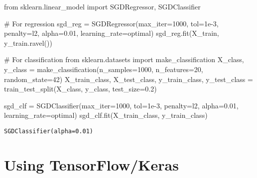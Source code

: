 \documentclass[
  letterpaper,
  DIV=11,
  numbers=noendperiod]{scrreprt}
\newenvironment{Shaded}{\begin{snugshade}}{\end{snugshade}}
\newcommand{\CommentTok}[1]{\textcolor[rgb]{0.37,0.37,0.37}{#1}}
\newcommand{\DecValTok}[1]{\textcolor[rgb]{0.68,0.00,0.00}{#1}}
\newcommand{\FloatTok}[1]{\textcolor[rgb]{0.68,0.00,0.00}{#1}}
\newcommand{\ImportTok}[1]{\textcolor[rgb]{0.00,0.46,0.62}{#1}}
\newcommand{\NormalTok}[1]{\textcolor[rgb]{0.00,0.23,0.31}{#1}}
\newcommand{\OperatorTok}[1]{\textcolor[rgb]{0.37,0.37,0.37}{#1}}
\newcommand{\StringTok}[1]{\textcolor[rgb]{0.13,0.47,0.30}{#1}}
\begin{document}
\begin{Shaded}
\begin{Highlighting}[]
\ImportTok{from}\NormalTok{ sklearn.linear\_model }\ImportTok{import}\NormalTok{ SGDRegressor, SGDClassifier}

\CommentTok{\# For regression}
\NormalTok{sgd\_reg }\OperatorTok{=}\NormalTok{ SGDRegressor(max\_iter}\OperatorTok{=}\DecValTok{1000}\NormalTok{, tol}\OperatorTok{=}\FloatTok{1e{-}3}\NormalTok{, penalty}\OperatorTok{=}\StringTok{\textquotesingle{}l2\textquotesingle{}}\NormalTok{, alpha}\OperatorTok{=}\FloatTok{0.01}\NormalTok{, learning\_rate}\OperatorTok{=}\StringTok{\textquotesingle{}optimal\textquotesingle{}}\NormalTok{)}
\NormalTok{sgd\_reg.fit(X\_train, y\_train.ravel())}

\CommentTok{\# For classification}
\ImportTok{from}\NormalTok{ sklearn.datasets }\ImportTok{import}\NormalTok{ make\_classification}
\NormalTok{X\_class, y\_class }\OperatorTok{=}\NormalTok{ make\_classification(n\_samples}\OperatorTok{=}\DecValTok{1000}\NormalTok{, n\_features}\OperatorTok{=}\DecValTok{20}\NormalTok{, random\_state}\OperatorTok{=}\DecValTok{42}\NormalTok{)}
\NormalTok{X\_train\_class, X\_test\_class, y\_train\_class, y\_test\_class }\OperatorTok{=}\NormalTok{ train\_test\_split(X\_class, y\_class, test\_size}\OperatorTok{=}\FloatTok{0.2}\NormalTok{)}

\NormalTok{sgd\_clf }\OperatorTok{=}\NormalTok{ SGDClassifier(max\_iter}\OperatorTok{=}\DecValTok{1000}\NormalTok{, tol}\OperatorTok{=}\FloatTok{1e{-}3}\NormalTok{, penalty}\OperatorTok{=}\StringTok{\textquotesingle{}l2\textquotesingle{}}\NormalTok{, alpha}\OperatorTok{=}\FloatTok{0.01}\NormalTok{, learning\_rate}\OperatorTok{=}\StringTok{\textquotesingle{}optimal\textquotesingle{}}\NormalTok{)}
\NormalTok{sgd\_clf.fit(X\_train\_class, y\_train\_class)}
\end{Highlighting}
\end{Shaded}

\begin{verbatim}
SGDClassifier(alpha=0.01)
\end{verbatim}

\section{Using TensorFlow/Keras}\label{using-tensorflowkeras}
\end{document}
